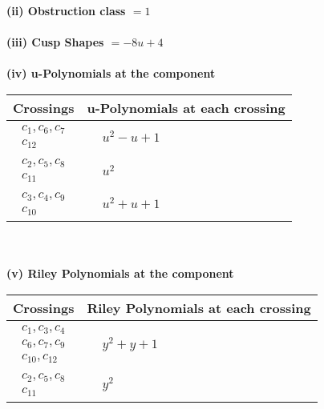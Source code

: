 \documentclass[1p]{elsarticle_modified}
\theoremstyle{definition}
\begin{document}
\flushleft \textbf{(ii) Obstruction class $= 1$}\\~\\
\flushleft \textbf{(iii) Cusp Shapes $= -8 u+4$}\\~\\
\newpage\renewcommand{\arraystretch}{1}
\flushleft \textbf{(iv) u-Polynomials at the component}\newline \\
\begin{tabular}{m{50pt}|m{274pt}}
Crossings & \hspace{64pt}u-Polynomials at each crossing \\
\hline $$\begin{aligned}c_{1},c_{6},c_{7}\\c_{12}\end{aligned}$$&$\begin{aligned}
&u^2- u+1
\end{aligned}$\\
\hline $$\begin{aligned}c_{2},c_{5},c_{8}\\c_{11}\end{aligned}$$&$\begin{aligned}
&u^2
\end{aligned}$\\
\hline $$\begin{aligned}c_{3},c_{4},c_{9}\\c_{10}\end{aligned}$$&$\begin{aligned}
&u^2+u+1
\end{aligned}$\\
\hline
\end{tabular}\\~\\
\newpage\renewcommand{\arraystretch}{1}
\flushleft \textbf{(v) Riley Polynomials at the component}\newline \\
\begin{tabular}{m{50pt}|m{274pt}}
Crossings & \hspace{64pt}Riley Polynomials at each crossing \\
\hline $$\begin{aligned}c_{1},c_{3},c_{4}\\c_{6},c_{7},c_{9}\\c_{10},c_{12}\end{aligned}$$&$\begin{aligned}
&y^2+y+1
\end{aligned}$\\
\hline $$\begin{aligned}c_{2},c_{5},c_{8}\\c_{11}\end{aligned}$$&$\begin{aligned}
&y^2
\end{aligned}$\\
\hline
\end{tabular}\\~\\
\end{document}
